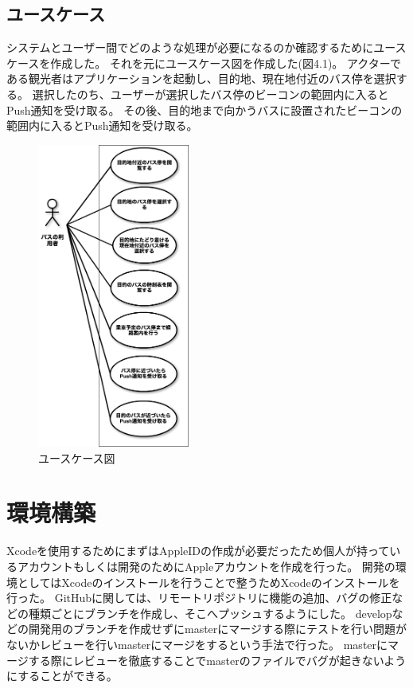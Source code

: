 \documentclass[openany,11pt,papersize]{jsbook}
\begin{document}

\subsection{ユースケース}
システムとユーザー間でどのような処理が必要になるのか確認するためにユースケースを作成した。
それを元にユースケース図を作成した(図4.1)。
アクターである観光者はアプリケーションを起動し、目的地、現在地付近のバス停を選択する。
選択したのち、ユーザーが選択したバス停のビーコンの範囲内に入るとPush通知を受け取る。
その後、目的地まで向かうバスに設置されたビーコンの範囲内に入るとPush通知を受け取る。

\begin{figure}[htbp]
  \begin{center}
    \includegraphics[clip,width=5.0cm]{img/usecase.png}
    \caption{ユースケース図}
    \label{fig:usecase}
  \end{center}
\end{figure}


\section{環境構築}
Xcodeを使用するためにまずはAppleIDの作成が必要だったため個人が持っているアカウントもしくは開発のためにAppleアカウントを作成を行った。
開発の環境としてはXcodeのインストールを行うことで整うためXcodeのインストールを行った。
GitHubに関しては、リモートリポジトリに機能の追加、バグの修正などの種類ごとにブランチを作成し、そこへプッシュするようにした。
developなどの開発用のブランチを作成せずにmasterにマージする際にテストを行い問題がないかレビューを行いmasterにマージをするという手法で行った。
masterにマージする際にレビューを徹底することでmasterのファイルでバグが起きないようにすることができる。
\end{document}
